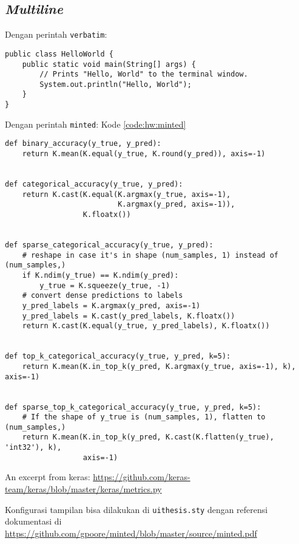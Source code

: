 \subsection{\textit{Multiline}}

Dengan perintah \verb|verbatim|: 

\begin{verbatim}	
public class HelloWorld {
    public static void main(String[] args) {
        // Prints "Hello, World" to the terminal window.
        System.out.println("Hello, World");
    }
}
\end{verbatim}

Dengan perintah \verb|minted|: Kode \ref{code:hw:minted}
\begin{listing}[H]
    \begin{verbatim}
def binary_accuracy(y_true, y_pred):
    return K.mean(K.equal(y_true, K.round(y_pred)), axis=-1)


def categorical_accuracy(y_true, y_pred):
    return K.cast(K.equal(K.argmax(y_true, axis=-1),
                          K.argmax(y_pred, axis=-1)),
                  K.floatx())


def sparse_categorical_accuracy(y_true, y_pred):
    # reshape in case it's in shape (num_samples, 1) instead of (num_samples,)
    if K.ndim(y_true) == K.ndim(y_pred):
        y_true = K.squeeze(y_true, -1)
    # convert dense predictions to labels
    y_pred_labels = K.argmax(y_pred, axis=-1)
    y_pred_labels = K.cast(y_pred_labels, K.floatx())
    return K.cast(K.equal(y_true, y_pred_labels), K.floatx())


def top_k_categorical_accuracy(y_true, y_pred, k=5):
    return K.mean(K.in_top_k(y_pred, K.argmax(y_true, axis=-1), k), axis=-1)


def sparse_top_k_categorical_accuracy(y_true, y_pred, k=5):
    # If the shape of y_true is (num_samples, 1), flatten to (num_samples,)
    return K.mean(K.in_top_k(y_pred, K.cast(K.flatten(y_true), 'int32'), k),
                  axis=-1)
    \end{verbatim}
    \caption{An excerpt from keras: \url{https://github.com/keras-team/keras/blob/master/keras/metrics.py}}
    \label{code:hw:minted}
\end{listing}

Konfigurasi tampilan bisa dilakukan di \verb|uithesis.sty| dengan referensi dokumentasi di \url{https://github.com/gpoore/minted/blob/master/source/minted.pdf}